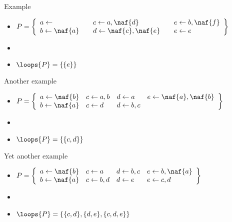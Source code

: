 \begin{frame}[c]{Example}
  \bigskip
  \begin{itemize}
  \item<1->
  \(
  P
  =
  \left\{
    \begin{array}{lll}
      a \leftarrow                  \quad &
      c \leftarrow a, \naf{d}       \quad &
      e \leftarrow b, \naf{f}
      \\
      b \leftarrow \naf{a}          \quad &
      d \leftarrow \naf{c}, \naf{e} \quad &
      e \leftarrow e
    \end{array}
  \right\}
  \)
  \bigskip
  \item<1-> []
    \begin{center}
    
    \end{center}
  \item<2-> $\loops{P}=\{\{e\}\}$
\end{itemize}
\end{frame}
\begin{frame}[c]{Another example}
  \bigskip
  \begin{itemize}
  \item<1->
  \(
  P
  =
  \left\{
    \begin{array}{llll}
        a \leftarrow \naf{b}
      & c \leftarrow a,b
      & d \leftarrow a
      & e \leftarrow\naf{a},\naf{b}
      \\
        b \leftarrow \naf{a}
      & c \leftarrow d
      & d \leftarrow b,c
      &
    \end{array}
  \right\}
  \)
  \bigskip
  \item<1-> []
    \begin{center}
    
    \end{center}
  \item<2-> $\loops{P}=\{\{c,d\}\}$
\end{itemize}
\end{frame}
\begin{frame}[c]{Yet another example}
  \bigskip
  \begin{itemize}
  \item<1->
  \(
  P
  =
  \left\{
    \begin{array}{llll}
        a\leftarrow \naf{b}
      & c\leftarrow a
      & d\leftarrow b,c
      & e\leftarrow b,\naf{a}
      \\
        b\leftarrow \naf{a}
      & c\leftarrow b,d
      & d\leftarrow e
      & e\leftarrow c,d
    \end{array}
  \right\}
  \)
  \bigskip
  \item<2-> []
    \begin{center}
    
    \end{center}
  \item<3-> $\loops{P}=\{\{c,d\},\{d,e\},\{c,d,e\}\}$
\end{itemize}
\end{frame}
